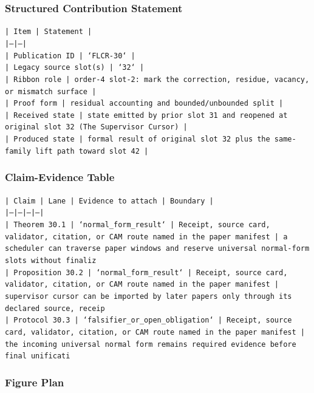 \documentclass[11pt]{article}
\begin{document}
\subsubsection*{Structured Contribution Statement}

\noindent\texttt{| Item | Statement |}\\
\noindent\texttt{|---|---|}\\
\noindent\texttt{| Publication ID | `FLCR-30` |}\\
\noindent\texttt{| Legacy source slot(s) | `32` |}\\
\noindent\texttt{| Ribbon role | order-4 slot-2: mark the correction, residue, vacancy, or mismatch surface |}\\
\noindent\texttt{| Proof form | residual accounting and bounded/unbounded split |}\\
\noindent\texttt{| Received state | state emitted by prior slot 31 and reopened at original slot 32 (The Supervisor Cursor) |}\\
\noindent\texttt{| Produced state | formal result of original slot 32 plus the same-family lift path toward slot 42 |}\\

\subsubsection*{Claim-Evidence Table}

\noindent\texttt{| Claim | Lane | Evidence to attach | Boundary |}\\
\noindent\texttt{|---|---|---|---|}\\
\noindent\texttt{| Theorem 30.1 | `normal\_form\_result` | Receipt, source card, validator, citation, or CAM route named in the paper manifest | a scheduler can traverse paper windows and reserve universal normal-form slots without finaliz}\\
\noindent\texttt{| Proposition 30.2 | `normal\_form\_result` | Receipt, source card, validator, citation, or CAM route named in the paper manifest | supervisor cursor can be imported by later papers only through its declared source, receip}\\
\noindent\texttt{| Protocol 30.3 | `falsifier\_or\_open\_obligation` | Receipt, source card, validator, citation, or CAM route named in the paper manifest | the incoming universal normal form remains required evidence before final unificati}\\

\subsubsection*{Figure Plan}
\end{document}
